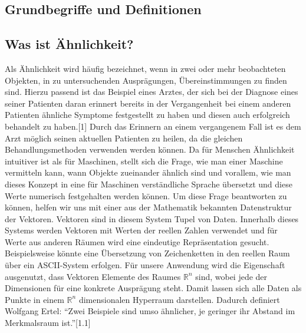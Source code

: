 \documentclass[a4paper]{scrartcl}
\begin{document}
\begin{multicols}{2}
        \section{Grundbegriffe und Definitionen}
            \subsection{Was ist Ähnlichkeit?}
                Als Ähnlichkeit wird häufig bezeichnet, wenn in zwei oder mehr beobachteten Objekten, in zu untersuchenden Ausprägungen, Übereinstimmungen zu finden sind. 
                Hierzu passend ist das Beispiel eines Arztes, der sich bei der Diagnose eines seiner Patienten daran erinnert bereits in der Vergangenheit bei einem anderen Patienten ähnliche Symptome festgestellt zu haben und diesen auch erfolgreich behandelt zu haben.[1] Durch das Erinnern an einem vergangenem Fall ist es dem Arzt möglich seinen aktuellen Patienten zu heilen, da die gleichen Behandlungsmethoden verwenden werden können.
                Da für Menschen Ähnlichkeit intuitiver ist als für Maschinen, stellt sich die Frage, wie man einer Maschine vermitteln kann, wann Objekte zueinander ähnlich sind und vorallem, wie man dieses Konzept in eine für Maschinen verständliche Sprache übersetzt und diese Werte numerisch festgehalten werden können.
                Um diese Frage beantworten zu können, helfen wir uns mit einer aus der Mathematik bekannten Datenstruktur der Vektoren.
                Vektoren sind in diesem System Tupel von Daten. Innerhalb dieses Systems werden Vektoren mit Werten der reellen Zahlen verwendet und für Werte aus anderen Räumen wird eine eindeutige Repräsentation gesucht. Beispielsweise könnte eine Übersetzung von Zeichenketten in den reellen Raum über ein ASCII-System erfolgen. 
                Für unsere Anwendung wird die Eigenschaft ausgenutzt, dass Vektoren Elemente des Raumes $\mathbb{R}^n$ sind, wobei jede der Dimensionen für eine konkrete Ausprägung steht. Damit lassen sich alle Daten als Punkte in einem $\mathbb{R}^n$ dimensionalen Hyperraum darstellen. Dadurch definiert Wolfgang Ertel: “Zwei Beispiele sind umso ähnlicher, je geringer ihr Abstand im Merkmalsraum ist.”[1.1] 

\end{multicols}
\end{document}
